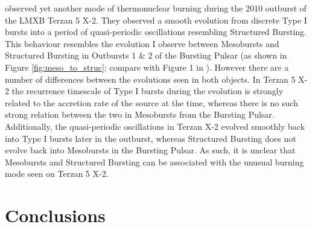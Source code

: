 \par \citet{Linares_MargStab} observed yet another mode of thermonuclear burning during the 2010 outburst of the LMXB Terzan 5 X-2.  They observed a smooth evolution from discrete Type I bursts into a period of quasi-periodic oscillations resembling Structured Bursting.  This behaviour resembles the evolution I observe between Mesobursts and Structured Bursting in Outbursts 1 \& 2 of the Bursting Pulsar (as shown in Figure \ref{fig:meso_to_struc}; compare with Figure 1 in \citealp{Linares_MargStab}).  However there are a number of differences between the evolutions seen in both objects.  In Terzan 5 X-2 the recurrence timescale of Type I bursts during the evolution is strongly related to the accretion rate of the source at the time, whereas there is no such strong relation between the two in Mesobursts from the Bursting Pulsar.  Additionally, the quasi-periodic oscillations in Terzan X-2 evolved smoothly back into Type I bursts later in the outburst, whereas Structured Bursting does not evolve back into Mesobursts in the Bursting Pulsar.  As such, it is unclear that Mesobursts and Structured Bursting can be associated with the unusual burning mode seen on Terzan 5 X-2.

\section{Conclusions}

